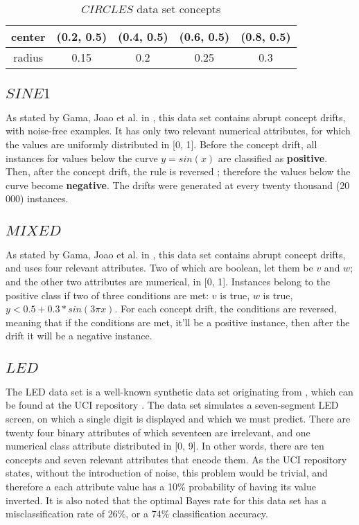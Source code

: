 \begin{table}[]
\centering
\caption{\label{table:circle_concepts}$CIRCLES$ data set concepts}
\begin{tabular}{|c|c|c|c|c|}
\hline
center & (0.2, 0.5) & (0.4, 0.5) & (0.6, 0.5) & (0.8, 0.5) \\ \hline
radius & 0.15       & 0.2        & 0.25       & 0.3        \\ \hline
\end{tabular}
\end{table}

\subsection{$SINE1$}
As stated by Gama, Joao et al. in \cite{gama2004learning}, this data set contains abrupt concept drifts, with noise-free examples. It has only two relevant numerical attributes, for which the values are uniformly distributed in [0, 1]. Before the concept drift, all instances for values below the curve $y = sin(x)$ are classified as \textbf{positive}. Then, after the concept drift, the rule is reversed ; therefore the values below the curve become \textbf{negative}. The drifts were generated at every twenty thousand (20 000) instances.

\subsection{$MIXED$}
As stated by Gama, Joao et al. in \cite{gama2004learning}, this data set contains abrupt concept drifts, and uses four relevant attributes. Two of which are boolean, let them be $v$ and $w$; and the other two attributes are numerical, in [0, 1]. Instances belong to the positive class if two of three conditions are met: $v$ is true, $w$ is true, $y < 0.5 + 0.3 * sin(3\pi x)$. For each concept drift, the conditions are reversed, meaning that if the conditions are met, it'll be a positive instance, then after the drift it will be a negative instance.

\subsection{$LED$}
The LED data set is a well-known synthetic data set  originating from \cite{breiman1984classification}, which can be found at the UCI repository \cite{blake1999uci}. The data set simulates a seven-segment LED screen, on which a single digit is displayed and which we must predict. There are twenty four binary attributes of which seventeen are irrelevant, and one numerical class attribute distributed in [0, 9]. In other words, there are ten concepts and seven relevant attributes that encode them. As the UCI repository states, without the introduction of noise, this problem would be trivial, and therefore a each attribute value has a 10\% probability of having its value inverted. It is also noted that the optimal Bayes rate for this data set has a misclassification rate of 26\%, or a 74\% classification accuracy.


